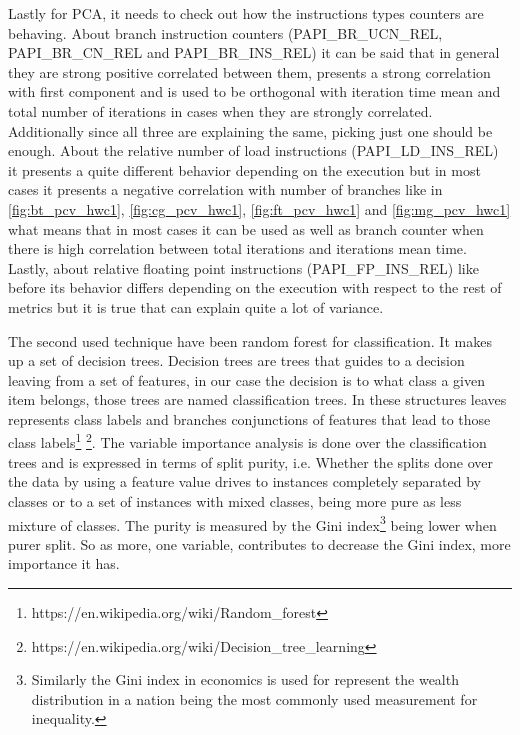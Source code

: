 Lastly for PCA, it needs to check out how the instructions types counters are
behaving. About branch instruction counters (PAPI\_BR\_UCN\_REL,
PAPI\_BR\_CN\_REL and PAPI\_BR\_INS\_REL) it can be said that in general they
are strong positive correlated between them, presents a strong
correlation with first component and is used to be orthogonal with iteration
time mean and total number of iterations in cases when they are strongly
correlated. 
Additionally since all three are explaining the same, picking just one
should be enough. About the relative number of load instructions 
(PAPI\_LD\_INS\_REL) it presents a quite different behavior depending on the
execution but in most cases it presents a negative correlation with number of
branches like in \ref{fig:bt_pcv_hwc1}, \ref{fig:cg_pcv_hwc1},
\ref{fig:ft_pcv_hwc1} and \ref{fig:mg_pcv_hwc1} what means that in most cases it
can be used as well as branch counter when there is high correlation between
total iterations and iterations mean time. Lastly, about relative floating
point instructions (PAPI\_FP\_INS\_REL) like before its behavior differs
depending on the execution with respect to the rest of metrics but it is true 
that can explain quite a lot of variance.

The second used technique have been random forest for classification. It makes
up a set of decision trees.
Decision trees are trees that guides to a decision leaving
from a set of features, in our case the decision is to what class a given item
belongs, those trees are named classification trees. In these structures leaves
represents class labels and branches conjunctions of features that lead to those
class labels\footnote{https://en.wikipedia.org/wiki/Random\_forest}
\footnote{https://en.wikipedia.org/wiki/Decision\_tree\_learning}. The variable
importance analysis is done over the classification trees and is expressed in
terms of split purity, i.e. Whether the splits done over the data by using a
feature value drives to instances completely separated by classes or to a set of
instances with mixed classes, being more pure as less mixture of classes. The
purity is measured by the Gini index\footnote{Similarly the Gini index in
economics is used for represent the wealth distribution in a nation being the
most commonly used measurement for inequality.} being lower when purer split. So
as more, one variable, contributes to decrease the Gini index, more importance
it has.


